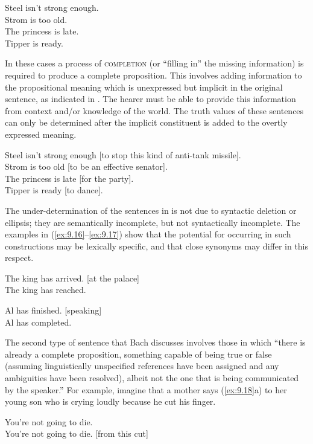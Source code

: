 \ea \label{ex:9.14}
\ea Steel isn’t strong enough.\\
\ex Strom is too old.\\
\ex The princess is late.\\
\ex Tipper is ready.
                       \z
\z


In these cases a process of \textsc{completion} (or “filling in” the missing information) is required to produce a complete proposition. This involves adding information to the propositional meaning which is unexpressed but implicit in the original sentence, as indicated in . The hearer must be able to provide this information from context and/or knowledge of the world. The truth values of these sentences can only be determined after the implicit constituent is added to the overtly expressed meaning.


\ea \label{ex:9.15}
\ea Steel isn’t strong enough [to stop this kind of anti-tank missile].\\
\ex Strom is too old [to be an effective senator].\\
\ex The princess is late [for the party].\\
\ex Tipper is ready [to dance].
                       \z
\z


The under-determination of the sentences in  is not due to syntactic deletion or ellipsis; they are semantically incomplete, but not syntactically incomplete. The examples in (\ref{ex:9.16}--\ref{ex:9.17}) show that the potential for occurring in such constructions may be lexically specific, and that close synonyms may differ in this respect.


\ea \label{ex:9.16}
\ea The king has arrived. [at the palace]\\
\ex *The king has reached.
                       \z
\z

\ea \label{ex:9.17}
\ea Al has finished. [speaking]\\
\ex *Al has completed.
                       \z
\z


The second type of sentence that Bach discusses involves those in which “there is already a complete proposition, something capable of being true or false (assuming linguistically unspecified references have been assigned and any ambiguities have been resolved), albeit not the one that is being communicated by the speaker.” For example, imagine that a mother says (\ref{ex:9.18}a) to her young son who is crying loudly because he cut his finger.


\ea \label{ex:9.18}
\ea You’re not going to die.\\
\ex You’re not going to die. [from this cut]
                       \z
\z


